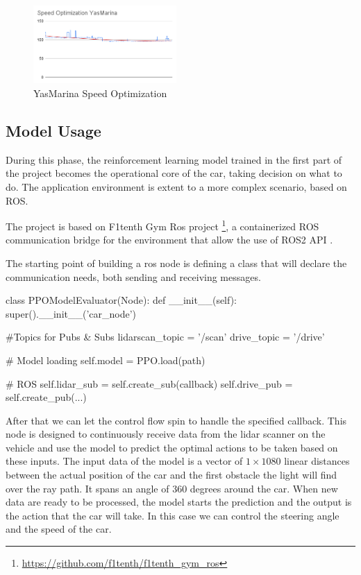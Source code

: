 \documentclass[conference]{IEEEtran}
\begin{document}
\begin{figure}[ht]
    \centering
    \includegraphics[width=0.485\textwidth]{img/Speed Optimization YasMarina.png}
    \caption{YasMarina Speed Optimization}
    \label{fig:YasMarina_Speed_primization}
\end{figure}

%
%
%
\subsection{Model Usage}

During this phase, the reinforcement learning model trained in the first part of the project becomes the operational core of the car, taking decision on what to do.
%
The application environment is extent to a more complex scenario, based on ROS.

The project is based on F1tenth Gym Ros project \footnote{\url{https://github.com/f1tenth/f1tenth\_gym\_ros}}, a containerized ROS communication bridge for the environment that allow the use of ROS2 API \cite{Ros2}.

The starting point of building a ros node is defining a class that will declare the communication needs, both sending and receiving messages.

\medskip

\begin{python}
class PPOModelEvaluator(Node):
  def __init__(self):
    super().__init__('car_node')

    #Topics for Pubs & Subs
    lidarscan_topic = '/scan'
    drive_topic = '/drive'

    # Model loading
    self.model = PPO.load(path)

    # ROS
    self.lidar_sub =
      self.create_sub(callback)
    self.drive_pub =
      self.create_pub(...)
\end{python}

\medskip

After that we can let the control flow spin to handle the specified callback.
%
This node is designed to continuously receive data from the lidar scanner on the vehicle and use the model to predict the optimal actions to be taken based on these inputs.
%
The input data of the model is a vector of $ 1\times1080 $ linear distances between the actual position of the car and the first obstacle the light will find over the ray path.
%
It spans an angle of 360 degrees around the car.
%
When new data are ready to be processed, the model starts the prediction and the output is the action that the car will take.
%
In this case we can control the steering angle and the speed of the car.
\end{document}
